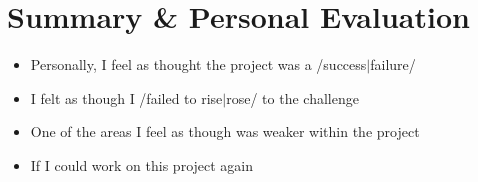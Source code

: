 \section{Summary \& Personal Evaluation}
{\color{red}
	\begin{itemize}
		\item Personally, I feel as thought the project was a /success$\mid$failure/
		\item I felt as though I /failed to rise$\mid$rose/ to the challenge
		\item One of the areas I feel as though was weaker within the project
		\item If I could work on this project again
	\end{itemize}
}

